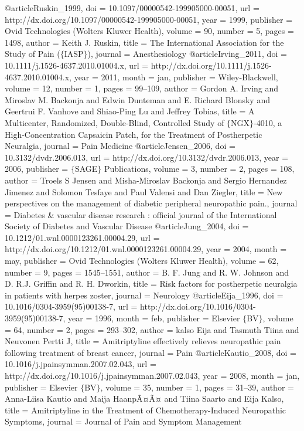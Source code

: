 @article{Ruskin_1999,
	doi = {10.1097/00000542-199905000-00051},
	url = {http://dx.doi.org/10.1097/00000542-199905000-00051},
	year = 1999,
	publisher = {Ovid Technologies (Wolters Kluwer Health)},
	volume = {90},
	number = {5},
	pages = {1498},
	author = {Keith J. Ruskin},
	title = {The International Association for the Study of Pain ($\lbrace$IASP$\rbrace$)},
	journal = {Anesthesiology}
}
@article{Irving_2011,
	doi = {10.1111/j.1526-4637.2010.01004.x},
	url = {http://dx.doi.org/10.1111/j.1526-4637.2010.01004.x},
	year = 2011,
	month = {jan},
	publisher = {Wiley-Blackwell},
	volume = {12},
	number = {1},
	pages = {99--109},
	author = {Gordon A. Irving and Miroslav M. Backonja and Edwin Dunteman and E. Richard Blonsky and Geertrui F. Vanhove and Shiao-Ping Lu and Jeffrey Tobias},
	title = {A Multicenter, Randomized, Double-Blind, Controlled Study of $\lbrace$NGX$\rbrace$-4010, a High-Concentration Capsaicin Patch, for the Treatment of Postherpetic Neuralgia},
	journal = {Pain Medicine}
}
@article{Jensen_2006,
	doi = {10.3132/dvdr.2006.013},
	url = {http://dx.doi.org/10.3132/dvdr.2006.013},
	year = 2006,
	publisher = {$\lbrace$SAGE$\rbrace$ Publications},
	volume = {3},
	number = {2},
	pages = {108},
	author = {Troels S Jensen and Misha-Miroslav Backonja and Sergio Hernandez Jimenez and Solomon Tesfaye and Paul Valensi and Dan Ziegler},
	title = {New perspectives on the management of diabetic peripheral neuropathic pain.},
	journal = {Diabetes {\&} vascular disease research : official journal of the International Society of Diabetes and Vascular Disease}
}
@article{Jung_2004,
	doi = {10.1212/01.wnl.0000123261.00004.29},
	url = {http://dx.doi.org/10.1212/01.wnl.0000123261.00004.29},
	year = 2004,
	month = {may},
	publisher = {Ovid Technologies (Wolters Kluwer Health)},
	volume = {62},
	number = {9},
	pages = {1545--1551},
	author = {B. F. Jung and R. W. Johnson and D. R.J. Griffin and R. H. Dworkin},
	title = {Risk factors for postherpetic neuralgia in patients with herpes zoster},
	journal = {Neurology}
}
@article{Eija_1996,
	doi = {10.1016/0304-3959(95)00138-7},
	url = {http://dx.doi.org/10.1016/0304-3959(95)00138-7},
	year = 1996,
	month = {feb},
	publisher = {Elsevier $\lbrace$BV$\rbrace$},
	volume = {64},
	number = {2},
	pages = {293--302},
	author = {kalso Eija and Tasmuth Tiina and Neuvonen Pertti J},
	title = {Amitriptyline effectively relieves neuropathic pain following treatment of breast cancer},
	journal = {Pain}
}
@article{Kautio_2008,
	doi = {10.1016/j.jpainsymman.2007.02.043},
	url = {http://dx.doi.org/10.1016/j.jpainsymman.2007.02.043},
	year = 2008,
	month = {jan},
	publisher = {Elsevier $\lbrace$BV$\rbrace$},
	volume = {35},
	number = {1},
	pages = {31--39},
	author = {Anna-Liisa Kautio and Maija HaanpÃ¤Ã¤ and Tiina Saarto and Eija Kalso},
	title = {Amitriptyline in the Treatment of Chemotherapy-Induced Neuropathic Symptoms},
	journal = {Journal of Pain and Symptom Management}
}
